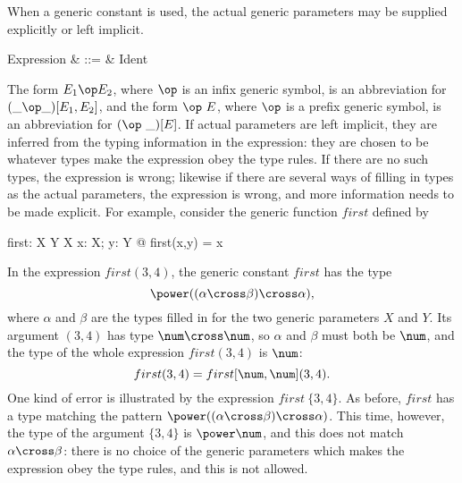 When a generic constant is used, the actual generic parameters
may be supplied explicitly or left implicit.\label{p:genuse}
\begin{syntax}
        Expression & ::= & %
                Ident\; \ropt
\end{syntax}
The form $E_1 \op E_2$, where $\op$ is an infix generic symbol, is an
abbreviation for $(\_ \op \_)[E_1, E_2]$, and the form $\op~E$, where
$\op$ is a prefix generic symbol, is an abbreviation for
$(\op~\_)[E]$. If actual parameters
are left implicit, they are inferred from the
typing information in the expression: they are chosen to be whatever
types make the expression obey the type rules.  If there are no such
types, the expression is wrong; likewise if there are several ways of
filling in types as the actual parameters, the expression is wrong,
and more information needs to be made explicit. For example, consider
the generic function $first$ defined by
\begin{gendef}[X,Y]
        first: X \cross Y \fun X
\where
        \forall x: X; y: Y @ first(x,y) = x
\end{gendef}
In the expression $first(3,4)$, the generic constant $first$ has the type
\[ \power ((\alpha \cross \beta) \cross \alpha), \]
where $\alpha$ and $\beta$ are the types filled in for the two generic
parameters $X$ and $Y$. Its argument $(3,4)$ has type $\num \cross
\num$, so $\alpha$ and $\beta$ must both be $\num$, and the type of the
whole expression $first(3,4)$ is $\num$:
\[ first(3,4) = first[\num,\num] (3,4). \]
One kind of error is illustrated by the expression $first~\{3,4\}$.
As before, $first$ has a type matching the pattern
$\power ((\alpha \cross \beta) \cross \alpha)$.  This time, however,
the type of the argument $\{3,4\}$ is $\power \num$, and this does not
match $\alpha \cross \beta$: there is no choice of the generic
parameters which makes the expression obey the type rules, and this is
not allowed.


